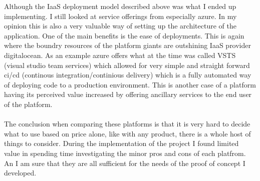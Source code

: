 \documentclass[]{uiophd}
\begin{document}
Although the IaaS deployment model described above was what I ended up implementing. I still looked at service offerings from especially azure. In my opinion this is also a very valuable way of setting up the architecture of the application. One of the main benefits is the ease of deployments. This is again where the boundry resources of the platform giants are outshining IaaS provider digitalocean. As an example azure offers what at the time was called VSTS (visual studio team services) which allowed for very simple and straight forward ci/cd (continous integration/continious delivery) which is a fully automated way of deploying code to a production environment. This is another case of a platform having its perceived value increased by offering ancillary services to the end user of the platform. 
\\\\
The conclusion when comparing these platforms is that it is very hard to decide what to use based on price alone, like with any product, there is a whole host of things to consider. During the implementation of the project I found limited value in spending time investigating the minor pros and cons of each platfrom. An I am sure that they are all sufficient for the needs of the proof of concept I developed.
\end{document}
